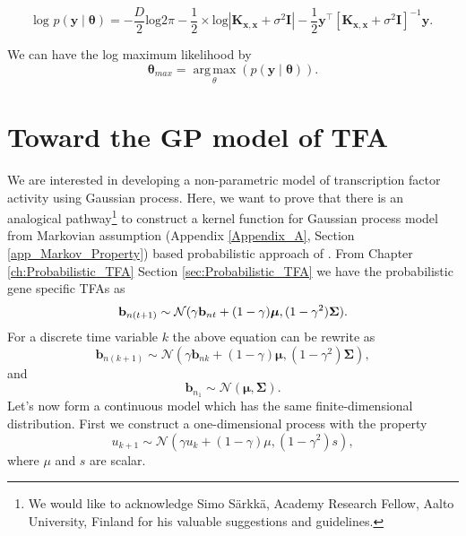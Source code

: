 \begin{equation} \label{eq:Likelihood}
 \text{log } p\left(\mathbf{y}\middle|\boldsymbol{\theta}\right) =
    - \frac{D}{2}\text{log}2\pi - \frac{1}{2}\times \text{log} \left| \mathbf{K_{x,x}} + \sigma^2\mathbf{I}\right|
    - \frac{1}{2}\mathbf{y}^\top \left[\mathbf{K_{x,x}} + \sigma^2\mathbf{I} \right]^{-1}\mathbf{y}.
\end{equation}

We can have the log maximum likelihood by
\begin{equation} \label{eq:LML}
 \boldsymbol{\theta}_{max} =  \operatorname*{arg\,max}_\theta \left( p\left(\mathbf{y}\middle|\boldsymbol{\theta}\right) \right).
\end{equation}

\section{Toward the GP model of TFA}\label{Sec:Toward_TFA}
 We are interested in developing a non-parametric model of transcription factor activity using Gaussian process. Here, we want to prove that there is an analogical pathway\footnote{We would like to acknowledge Simo S\"arkk\"a, Academy Research Fellow, Aalto University, Finland for his valuable suggestions and guidelines.} to construct a kernel function for Gaussian process model from Markovian assumption (Appendix \ref{Appendix_A}, Section \ref{app_Markov_Property}) based probabilistic approach of \cite{Sanguinetti:2006}. From Chapter \ref{ch:Probabilistic_TFA} Section \ref{sec:Probabilistic_TFA} we have the probabilistic gene specific TFAs as
\begin{equation} \label{eq:tfa_SanG_updateCh4}
  \bold{b}_{n(t+1)} \sim \mathcal{N} (\gamma \bold{b}_{nt} + (1-\gamma)\boldsymbol{\mu},(1-\gamma^2)\bold{\Sigma}).
\end{equation}
For a discrete time variable $k$ the above equation can be rewrite as
\begin{equation}
\textbf{b}_{n(k+1)} \sim \mathcal{N}\left(\gamma \textbf{b}_{nk} + (1 - \gamma) \boldsymbol{\mu}, (1 - \gamma^2) \boldsymbol{\Sigma}\right),
\end{equation}
and
\begin{equation}
\textbf{b}_{n_1} \sim \mathcal{N}\left(\boldsymbol{\mu}, \boldsymbol{\Sigma}\right).
\end{equation}
Let's now form a continuous model which has the same finite-dimensional distribution. First we construct a one-dimensional process with the property
\begin{equation}
u_{k+1} \sim \mathcal{N}\left(\gamma u_k + \left(1 - \gamma\right) \mu, (1 - \gamma^2)s \right),
\end{equation}
where $\mu$ and $s$ are scalar.

